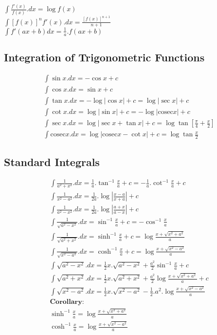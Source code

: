 \vspace{2mm}

\begin{tcolorbox}
\begin{center}
$ \int \frac{f'(x)}{f(x)}.dx = \log{f(x)} $ \\
$ \int [f(x)]^n f'(x).dx = \frac{[f(x)]^{n+1}}{n+1} $ \\
$ \int f'(ax+b)dx = \frac{1}{a}.{f(ax+b)} $
\end{center}
\end{tcolorbox}

\subsection{Integration of Trigonometric Functions}
\begin{align*}
&\int \sin x.dx = -\cos x + c \\[2mm]
&\int \cos x.dx = \sin x + c \\[2mm]
&\int \tan x.dx = -\log |\cos x| + c = \log |\sec x| + c \\[2mm]
&\int \cot x.dx =  \log |\sin x| + c =  -\log |\mathrm{cosec} x| + c \\[2mm]
&\int \sec x.dx = \log |\sec x + \tan x| + c = \log \tan \left[\frac{\pi}{4} + \frac{x}{2} \right] \\[2mm]
&\int \mathrm{cosec} x.dx = \log |\mathrm{cosec}x - \cot x| + c = \log \tan \frac{x}{2}
\end{align*}

\subsection{Standard Integrals}
\begin{align*}
&\int \frac{1}{a^2+x^2}.dx = \frac{1}{a}.\tan^{-1} {\frac{x}{a}} + c = -\frac{1}{a}.\cot^{-1} {\frac{x}{a}} + c \\[3mm]
&\int \frac{1}{x^2-a^2}.dx = \frac{1}{2a}.\log\left|\frac{x-a}{x+a}\right|+c\\[3mm]
&\int \frac{1}{a^2-x^2}.dx = \frac{1}{2a}.\log\left|\frac{a+x}{a-x}\right|+
c \\[6mm]
&\int \frac{1}{\sqrt{a^2-x^2}}.dx = \sin^{-1}\frac{x}{a}+c = -\cos^{-1}\frac{x}{a}\\[3mm]
&\int \frac{1}{\sqrt{a^2+x^2}}.dx = \sinh^{-1}\frac{x}{a}+c = \log \frac{x+\sqrt{x^2+a^2}}{a}\\[3mm]
&\int \frac{1}{\sqrt{x^2-a^2}}.dx = \cosh^{-1}\frac{x}{a}+c = \log \frac{x+\sqrt{x^2-a^2}}{a}\\[6mm]
&\int\sqrt{a^2-x^2}.dx = \frac{1}{2}x.\sqrt{a^2-x^2}+\frac{a^2}{2}\sin^{-1}\frac{x}{a}+c \\[3mm]
&\int\sqrt{a^2+x^2}.dx = \frac{1}{2}x.\sqrt{a^2+x^2}+\frac{a^2}{2}\log\frac{x+\sqrt{x^2+a^2}}{a}+c \\[3mm]
&\int\sqrt{x^2-a^2}.dx = \frac{1}{2}x.\sqrt{x^2-a^2}-\frac{1}{2}.a^2.\log\frac{x+\sqrt{x^2-a^2}}{a} \\[6mm]
&\textbf{Corollary:} \\[2mm]
&\sinh^{-1}\frac{x}{a} = \log\frac{x+\sqrt{x^2+a^2}}{a} \\[3mm]
&\cosh^{-1}\frac{x}{a} = \log\frac{x+\sqrt{x^2-a^2}}{a}
\end{align*}

